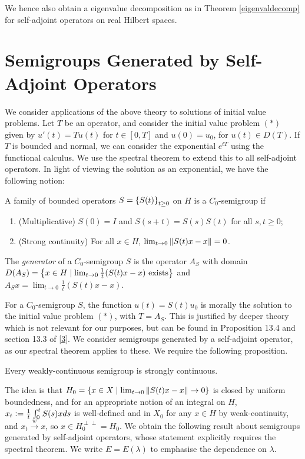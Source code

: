 \documentclass[10pt]{amsart}
\begin{document}
We hence also obtain a eigenvalue decomposition as in Theorem \ref{eigenvaldecomp} for self-adjoint operators on real Hilbert spaces.


\section{Semigroups Generated by Self-Adjoint Operators}
We consider applications of the above theory to solutions of initial value problems. Let $T$ be an operator, and consider the initial value problem $(*)$ given by $u'(t) = Tu(t)$ for $t \in [0, T]$ and $u(0) = u_0$, for $u(t) \in D(T)$. If $T$ is bounded and normal, we can consider the exponential $e^{tT}$ using the functional calculus. We use the spectral theorem to extend this to all self-adjoint operators. In light of viewing the solution as an exponential, we have the following notion:
\begin{definition}
    A family of bounded operators $S = \left\{  S(t)  \right\}_{t \geq 0}$ on $H$ is a $C_0$-semigroup if
    \begin{enumerate}
        \item (Multiplicative) $S(0) = I$ and $S(s + t) = S(s)S(t)$ for all $s, t \geq 0$;
        \item (Strong continuity) For all $x \in H$, $\lim_{t \to 0}\left\| S(t)x - x \right\| = 0$.
    \end{enumerate} 
    The \emph{generator} of a $C_0$-semigroup $S$ is the operator $A_S$ with domain $D(A_S) = \left\{  x \in H \mid \lim_{t \to 0}\frac1t(S(t)x - x) \text{ exists}  \right\}$ and $A_Sx = \lim_{t \to 0}\frac1t(S(t)x - x)$.
\end{definition}
For a $C_0$-semigroup $S$, the function $u(t) = S(t)u_0$ is morally the solution to the initial value problem $(*)$, with $T = A_S$. This is justified by deeper theory which is not relevant for our purposes, but can be found in Proposition 13.4 and section 13.3 of \hyperlink{jvn}{[3]}. We consider semigroups generated by a self-adjoint operator, as our spectral theorem applies to these. We require the following proposition.
\begin{proposition}
    Every weakly-continuous semigroup is strongly continuous.
\end{proposition}
The idea is that $H_0 = \left\{  x \in X \mid \lim_{t \to 0} \left\| S(t)x - x \right\| \to 0  \right\}$ is closed by uniform boundedness, and for an appropriate notion of an integral on $H$, $x_t \vcentcolon= \frac1t\int_0^tS(s)xds$ is well-defined and in $X_0$ for any $x \in H$ by weak-continuity, and $x_t \xrightarrow{w} x$, so $x \in H_0^{\perp\perp} = H_0$. We obtain the following result about semigroups generated by self-adjoint operators, whose statement explicitly requires the spectral theorem. We write $E = E(\lambda)$ to emphasise the dependence on $\lambda$.
\end{document}
